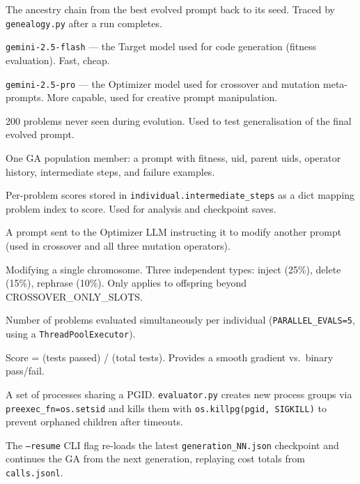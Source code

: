 \documentclass[11pt,a4paper]{report}
\newcommand{\fn}[1]{\texttt{#1}}
\begin{document}
\begin{description}[style=nextline, leftmargin=3cm, itemsep=2pt]
\item[Genealogy] The ancestry chain from the best evolved prompt back to its seed.
  Traced by \fn{genealogy.py} after a run completes.

\item[Gemini Flash] \fn{gemini-2.5-flash} --- the Target model used for code
  generation (fitness evaluation).  Fast, cheap.

\item[Gemini Pro] \fn{gemini-2.5-pro} --- the Optimizer model used for crossover
  and mutation meta-prompts.  More capable, used for creative prompt manipulation.

\item[Held-out set] 200 problems never seen during evolution.  Used to test
  generalisation of the final evolved prompt.

\item[Individual] One GA population member: a prompt with fitness, uid, parent uids,
  operator history, intermediate steps, and failure examples.

\item[Intermediate steps] Per-problem scores stored in \fn{individual.intermediate\_steps}
  as a dict mapping problem index to score.  Used for analysis and checkpoint saves.

\item[Meta-prompt] A prompt sent to the Optimizer LLM instructing it to modify another
  prompt (used in crossover and all three mutation operators).

\item[Mutation] Modifying a single chromosome.  Three independent types: inject (25\%),
  delete (15\%), rephrase (10\%).  Only applies to offspring beyond CROSSOVER\_ONLY\_SLOTS.

\item[PARALLEL\_EVALS] Number of problems evaluated simultaneously per individual
  (\fn{PARALLEL\_EVALS=5}, using a \fn{ThreadPoolExecutor}).

\item[Partial credit] Score = (tests passed) / (total tests).  Provides a smooth
  gradient vs.\ binary pass/fail.

\item[Process group] A set of processes sharing a PGID.  \fn{evaluator.py} creates
  new process groups via \fn{preexec\_fn=os.setsid} and kills them with
  \fn{os.killpg(pgid, SIGKILL)} to prevent orphaned children after timeouts.

\item[Resume] The \fn{--resume} CLI flag re-loads the latest \fn{generation\_NN.json}
  checkpoint and continues the GA from the next generation, replaying cost totals from
  \fn{calls.jsonl}.


\end{description}
\end{document}
